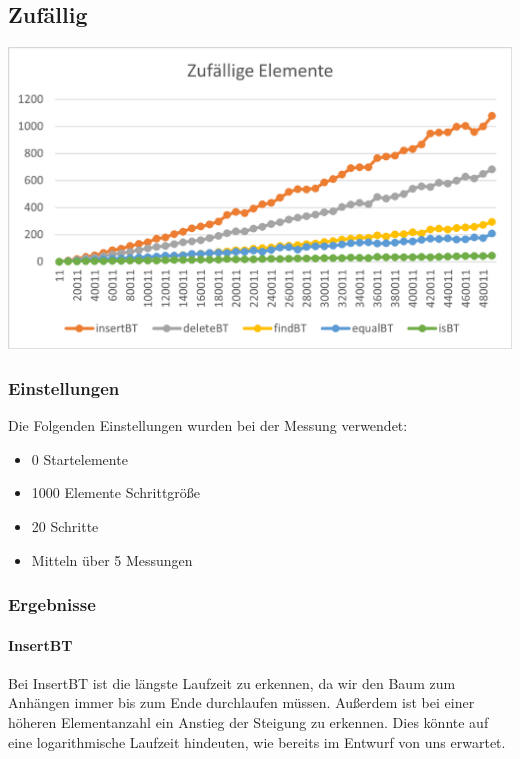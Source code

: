 \documentclass[11pt]{article}
\begin{document}
    \subsection{Zufällig}\label{subsec:zufaellig}

    \begin{center}
        \includegraphics[width=0.9\columnwidth] {ZeitAvg.pdf}
    \end{center}

    \subsubsection{Einstellungen}
    Die Folgenden Einstellungen wurden bei der Messung verwendet:
    \begin{itemize}
        \item 0 Startelemente
        \item 1000 Elemente Schrittgröße
        \item 20 Schritte
        \item Mitteln über 5 Messungen
    \end{itemize}
    
    \subsubsection{Ergebnisse}
        \paragraph{InsertBT}
        
        Bei InsertBT ist die längste Laufzeit zu erkennen, da wir den Baum zum Anhängen immer bis zum Ende durchlaufen müssen. Außerdem ist bei einer höheren Elementanzahl ein Anstieg der Steigung zu erkennen. Dies könnte auf eine logarithmische Laufzeit hindeuten, wie bereits im Entwurf von uns erwartet.
\end{document}
